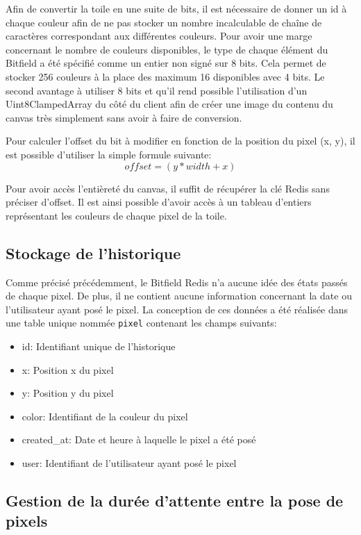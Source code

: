 Afin de convertir la toile en une suite de bits, il est nécessaire de donner un id à chaque couleur afin de ne pas stocker un nombre incalculable de chaîne de caractères correspondant aux différentes couleurs. Pour avoir une marge concernant le nombre de couleurs disponibles, le type de chaque élément du Bitfield a été spécifié comme un entier non signé sur 8 bits. Cela permet de stocker 256 couleurs à la place des maximum 16 disponibles avec 4 bits. Le second avantage à utiliser 8 bits et qu'il rend possible l'utilisation d'un Uint8ClampedArray \cite{uint8clampedarray} du côté du client afin de créer une image du contenu du canvas très simplement sans avoir à faire de conversion.

Pour calculer l'offset du bit à modifier en fonction de la position du pixel (x, y), il est possible d'utiliser la simple formule suivante:
\begin{equation}
  offset = (y * width + x)
\end{equation}

Pour avoir accès l'entièreté du canvas, il suffit de récupérer la clé Redis sans préciser d'offset. Il est ainsi possible d'avoir accès à un tableau d'entiers représentant les couleurs de chaque pixel de la toile.

\subsection{Stockage de l'historique}

Comme précisé précédemment, le Bitfield Redis n'a aucune idée des états passés de chaque pixel. De plus, il ne contient aucune information concernant la date ou l'utilisateur ayant posé le pixel. La conception de ces données a été réalisée dans une table unique nommée \texttt{pixel} contenant les champs suivants:

\begin{itemize}
  \item id: Identifiant unique de l'historique
  \item x: Position x du pixel
  \item y: Position y du pixel
  \item color: Identifiant de la couleur du pixel
  \item created\_at: Date et heure à laquelle le pixel a été posé
  \item user: Identifiant de l'utilisateur ayant posé le pixel
\end{itemize}

\subsection{Gestion de la durée d'attente entre la pose de pixels}

